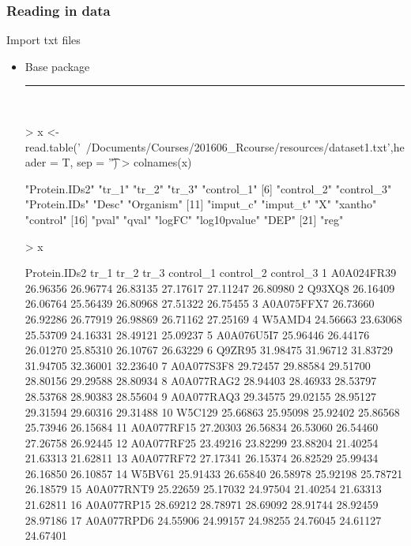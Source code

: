 \documentclass{beamer}
\begin{document}
\begin{frame}[fragile]
	\frametitle{Reading in data}
	\centering \Large Import txt files
	\begin{itemize}
		\small
		\item Base package
\rule{\textwidth}{0.4pt}\\
\tiny
\setlength{\fancyvrbtopsep}{-1pt}
\setlength{\fancyvrbpartopsep}{-1pt}
\begin{Schunk}
\begin{Sinput}
> x <- read.table('~/Documents/Courses/201606_Rcourse/resources/dataset1.txt',header = T, sep = '\t')
> colnames(x)
\end{Sinput}
\begin{Soutput}
 [1] "Protein.IDs2" "tr_1"         "tr_2"         "tr_3"         "control_1"   
 [6] "control_2"    "control_3"    "Protein.IDs"  "Desc"         "Organism"    
[11] "imput_c"      "imput_t"      "X"            "xantho"       "control"     
[16] "pval"         "qval"         "logFC"        "log10pvalue"  "DEP"         
[21] "reg"         
\end{Soutput}
\begin{Sinput}
> x
\end{Sinput}
\begin{Soutput}
   Protein.IDs2     tr_1     tr_2     tr_3 control_1 control_2 control_3
1    A0A024FR39 26.96356 26.96774 26.83135  27.17617  27.11247  26.80980
2        Q93XQ8 26.16409 26.06764 25.56439  26.80968  27.51322  26.75455
3    A0A075FFX7 26.73660 26.92286 26.77919  26.98869  26.71162  27.25169
4        W5AMD4 24.56663 23.63068 25.53709  24.16331  28.49121  25.09237
5    A0A076U5I7 25.96446 26.44176 26.01270  25.85310  26.10767  26.63229
6        Q9ZR95 31.98475 31.96712 31.83729  31.94705  32.36001  32.23640
7    A0A077S3F8 29.72457 29.88584 29.51700  28.80156  29.29588  28.80934
8    A0A077RAG2 28.94403 28.46933 28.53797  28.53768  28.90383  28.55604
9    A0A077RAQ3 29.34575 29.02155 28.95127  29.31594  29.60316  29.31488
10       W5C129 25.66863 25.95098 25.92402  25.86568  25.73946  26.15684
11   A0A077RF15 27.20303 26.56834 26.53060  26.54460  27.26758  26.92445
12   A0A077RF25 23.49216 23.82299 23.88204  21.40254  21.63313  21.62811
13   A0A077RF72 27.17341 26.15374 26.82529  25.99434  26.16850  26.10857
14       W5BV61 25.91433 26.65840 26.58978  25.92198  25.78721  26.18579
15   A0A077RNT9 25.22659 25.17032 24.97504  21.40254  21.63313  21.62811
16   A0A077RP15 28.69212 28.78971 28.69092  28.91744  28.92459  28.97186
17   A0A077RPD6 24.55906 24.99157 24.98255  24.76045  24.61127  24.67401

\end{Soutput}
\end{Schunk}
\end{itemize}
\end{frame}
\end{document}
